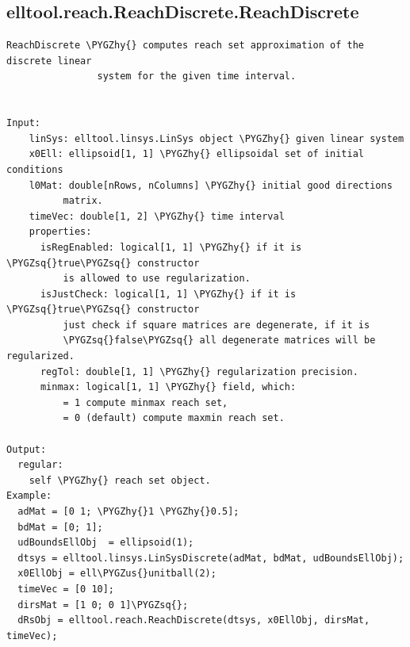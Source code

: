 \documentclass[letterpaper,10pt,english]{sphinxmanual}
\def\PYGZus{\char`\_}
\def\PYGZhy{\char`\-}
\def\PYGZsq{\char`\'}
\begin{document}
\subsection{elltool.reach.ReachDiscrete.ReachDiscrete}
\label{chap_functions:elltool-reach-reachdiscrete-reachdiscrete}
\begin{Verbatim}[commandchars=\\\{\}]
ReachDiscrete \PYGZhy{} computes reach set approximation of the discrete linear
                system for the given time interval.


Input:
    linSys: elltool.linsys.LinSys object \PYGZhy{} given linear system
    x0Ell: ellipsoid[1, 1] \PYGZhy{} ellipsoidal set of initial conditions
    l0Mat: double[nRows, nColumns] \PYGZhy{} initial good directions
          matrix.
    timeVec: double[1, 2] \PYGZhy{} time interval
    properties:
      isRegEnabled: logical[1, 1] \PYGZhy{} if it is \PYGZsq{}true\PYGZsq{} constructor
          is allowed to use regularization.
      isJustCheck: logical[1, 1] \PYGZhy{} if it is \PYGZsq{}true\PYGZsq{} constructor
          just check if square matrices are degenerate, if it is
          \PYGZsq{}false\PYGZsq{} all degenerate matrices will be regularized.
      regTol: double[1, 1] \PYGZhy{} regularization precision.
      minmax: logical[1, 1] \PYGZhy{} field, which:
          = 1 compute minmax reach set,
          = 0 (default) compute maxmin reach set.

Output:
  regular:
    self \PYGZhy{} reach set object.
Example:
  adMat = [0 1; \PYGZhy{}1 \PYGZhy{}0.5];
  bdMat = [0; 1];
  udBoundsEllObj  = ellipsoid(1);
  dtsys = elltool.linsys.LinSysDiscrete(adMat, bdMat, udBoundsEllObj);
  x0EllObj = ell\PYGZus{}unitball(2);
  timeVec = [0 10];
  dirsMat = [1 0; 0 1]\PYGZsq{};
  dRsObj = elltool.reach.ReachDiscrete(dtsys, x0EllObj, dirsMat, timeVec);
\end{Verbatim}
\end{document}
